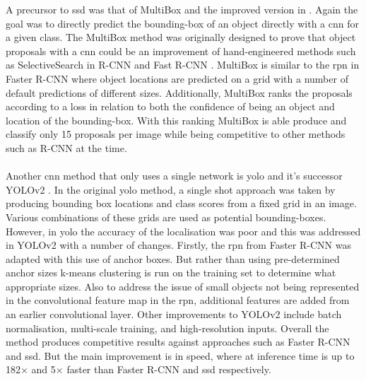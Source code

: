 A precursor to \gls{ssd} was that of MultiBox \cite{multibox1} and the improved version in \cite{multibox2}. Again the goal was to directly predict the bounding-box of an object directly with a \gls{cnn} for a given class. The MultiBox method was originally designed to prove that object proposals with a \gls{cnn} could be an improvement of hand-engineered methods such as SelectiveSearch \cite{selectivesearch} in R-CNN \cite{rcnn} and Fast R-CNN \cite{fastrcnn}. MultiBox is similar to the \gls{rpn} in Faster R-CNN \cite{fasterrcnn} where object locations are predicted on a grid with a number of default predictions of different sizes. Additionally, MultiBox ranks the proposals according to a loss in relation to both the confidence of being an object and location of the bounding-box. With this ranking MultiBox is able produce and classify only 15 proposals per image while being competitive to other methods such as R-CNN at the time.
\\\\
Another \gls{cnn} method that only uses a single network is \gls{yolo} \cite{yolo} and it's successor YOLOv2 \cite {yolov2}. In the original \gls{yolo} method, a single shot approach was taken by producing bounding box locations and class scores from a fixed grid in an image. Various combinations of these grids are used as potential bounding-boxes. However, in \gls{yolo} the accuracy of the localisation was poor and this was addressed in YOLOv2 with a number of changes. Firstly, the \gls{rpn} from Faster R-CNN \cite{fasterrcnn} was adapted with this use of anchor boxes. But rather than using pre-determined anchor sizes k-means clustering is run on the training set to determine what appropriate sizes. Also to address the issue of small objects not being represented in the convolutional feature map in the \gls{rpn}, additional features are added from an earlier convolutional layer. Other improvements to YOLOv2 include batch normalisation, multi-scale training, and high-resolution inputs. Overall the method produces competitive results against approaches such as Faster R-CNN and \gls{ssd}. But the main improvement is in speed, where at inference time is up to 182$\times$ and 5$\times$ faster than Faster R-CNN and \gls{ssd} respectively.
\\\\
